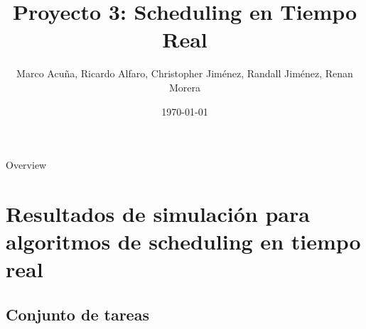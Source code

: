 \documentclass[xcolor=table]{beamer}
\title[Proyecto 3: Scheduling en Tiempo Real]{Proyecto 3: Scheduling en Tiempo Real} %
\author{Marco Acuña, Ricardo Alfaro, Christopher Jiménez, Randall Jiménez, Renan Morera} %
\institute[Maestria en Ciencias de la Computacion] %
{
Tecnológico de Costa Rica\\ %
\medskip
}
\date{\today} %
\begin{document}
\begin{frame}
\titlepage %
\end{frame}

\begin{frame}{Overview} %
\tableofcontents
\end{frame}



\section{Resultados de simulación para algoritmos de scheduling en tiempo real}

\subsection{Conjunto de tareas}
\begin{frame}


\end{frame}




%










\end{document}
